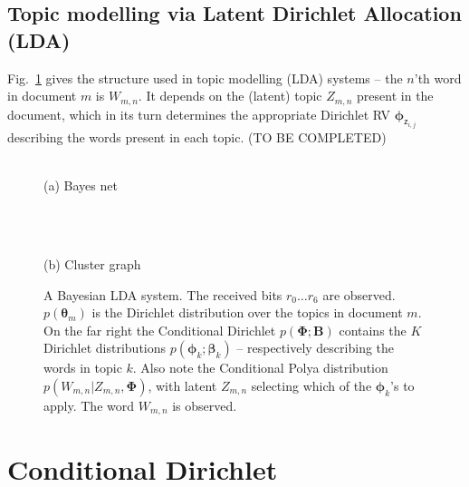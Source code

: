 \documentclass[oneside,english]{scrbook}
\begin{document}
\section*{Topic modelling via Latent Dirichlet Allocation (LDA)}

Fig.~\ref{fig:lda_bn} gives the structure used in topic modelling
(LDA) systems -- the $n$'th word in document $m$ is $W_{m,n}$. It
depends on the (latent) topic $Z_{m,n}$ present in the document, which
in its turn determines the appropriate Dirichlet RV
$\bm{\phi}_{\mathsf{z}_{i,j}}$ describing the words present in each
topic. (TO BE COMPLETED)

\begin{figure}[!h]
  \begin{centering}
    \parbox{0.95\textwidth}{
      \centering
      \\
      (a) Bayes net
    }\\[5mm]
  \end{centering}
  \begin{centering}
    \parbox{0.95\textwidth}{ \centering
      \\ (b)
      Cluster graph}
  \end{centering}
  \caption{A Bayesian LDA system. The received bits $r_0\ldots r_6$
    are observed. $p(\bm{\theta}_m)$ is the Dirichlet distribution
    over the topics in document $m$. On the far right the Conditional
    Dirichlet $p(\bm{\Phi};\bm{B})$ contains the $K$ Dirichlet
    distributions $p(\bm{\phi}_k;\bm{\beta}_k)$ -- respectively
    describing the words in topic $k$. Also note the Conditional Polya
    distribution $p(W_{m,n}|Z_{m,n},\bm{\Phi})$, with latent $Z_{m,n}$
    selecting which of the $\bm{\phi}_k$'s to apply. The word
    $W_{m,n}$ is observed. \label{fig:lda_bn} }
\end{figure}


\chapter{Conditional Dirichlet}
\end{document}
